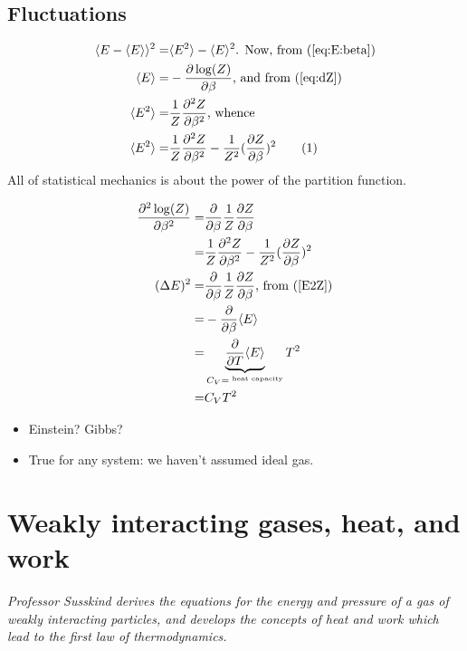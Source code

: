 \documentclass[]{article}
\newcommand\numberthis{\addtocounter{equation}{1}\tag{\theequation}}
\begin{document}
\subsection{Fluctuations}

\begin{align*}
	\langle E -  \langle E \rangle \rangle^2 =& \langle E^2 \rangle - \langle E \rangle^2\text{. Now, from (\ref{eq:E:beta})}\\
	\langle E \rangle=& - \frac{\partial \log(Z)}{\partial \beta}\text{, and from (\ref{eq:dZ})}\\
	 \langle E^2 \rangle =& \frac{1}{Z} \frac{\partial^2 Z}{\partial \beta^2} \text{, whence}\\
	 \langle E^2 \rangle =& \frac{1}{Z} \frac{\partial^2 Z}{\partial \beta^2} - \frac{1}{Z^2} (\frac{\partial Z}{\partial \beta})^2 \numberthis \label{E2Z}
\end{align*}
All of statistical mechanics is about the power of the partition function.

\begin{align*}
	\frac{\partial^2 \log(Z)}{\partial \beta^2} =& \frac{\partial}{\partial \beta} \frac{1}{Z} \frac{\partial Z}{\partial \beta}\\
	=& \frac{1}{Z} \frac{\partial^2 Z}{\partial \beta^2} - \frac{1}{Z^2} (\frac{\partial Z}{\partial \beta})^2\\
	(\Delta E)^2 =& \frac{\partial}{\partial \beta} \frac{1}{Z} \frac{\partial Z}{\partial \beta}\text{, from (\ref{E2Z})}\\
	=& - \frac{\partial}{\partial \beta} \langle E \rangle\\
	=&  \underbrace{\frac{\partial}{\partial T} \langle E \rangle}_{C_V=^\text{ heat capacity}} T^2\\
	=& C_V T^2
\end{align*}

\begin{itemize}
	\item Einstein? Gibbs?
	\item True for any system: we haven't assumed ideal gas.
\end{itemize}


\section{Weakly interacting gases, heat, and work}

\textit{Professor Susskind derives the equations for the energy and pressure of a gas of weakly interacting particles, and develops the concepts of heat and work which lead to the first law of thermodynamics.}
\end{document}
